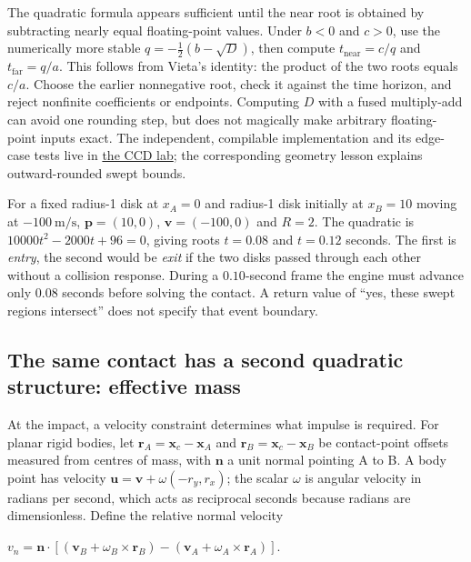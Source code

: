 The quadratic formula appears sufficient until the near root is obtained by subtracting nearly equal floating-point values. Under \(b<0\) and \(c>0\), use the numerically more stable \(q=-\tfrac12(b-\sqrt D)\), then compute \(t_{\mathrm{near}}=c/q\) and \(t_{\mathrm{far}}=q/a\). This follows from Vieta's identity: the product of the two roots equals \(c/a\). Choose the earlier nonnegative root, check it against the time horizon, and reject nonfinite coefficients or endpoints. Computing \(D\) with a fused multiply-add can avoid one rounding step, but does not magically make arbitrary floating-point inputs exact. The independent, compilable implementation and its edge-case tests live in \hyperref[source-file-887bbb1db2a031cbbf1eee43]{the CCD lab}; the corresponding geometry lesson explains outward-rounded swept bounds.

For a fixed radius-1 disk at \(x_A=0\) and radius-1 disk initially at \(x_B=10\) moving at \(-100\ \mathrm{m/s}\), \(\mathbf p=(10,0)\), \(\mathbf v=(-100,0)\) and \(R=2\). The quadratic is \(10000t^2-2000t+96=0\), giving roots \(t=0.08\) and \(t=0.12\) seconds. The first is \emph{entry}, the second would be \emph{exit} if the two disks passed through each other without a collision response. During a \(0.10\)-second frame the engine must advance only \(0.08\) seconds before solving the contact. A return value of ``yes, these swept regions intersect'' does not specify that event boundary.

\subsection{The same contact has a second quadratic structure: effective mass}\label{01-foundations-i-ch018-the-same-contact-has-a-second-quadratic-structure-effective-mass}

At the impact, a velocity constraint determines what impulse is required. For planar rigid bodies, let \(\mathbf r_A=\mathbf x_c-\mathbf x_A\) and \(\mathbf r_B=\mathbf x_c-\mathbf x_B\) be contact-point offsets measured from centres of mass, with \(\mathbf n\) a unit normal pointing A to B. A body point has velocity \(\mathbf u=\mathbf v+\omega(-r_y,r_x)\); the scalar \(\omega\) is angular velocity in radians per second, which acts as reciprocal seconds because radians are dimensionless. Define the relative normal velocity

\(v_n=\mathbf n\cdot\left[
(\mathbf v_B+\omega_B\times\mathbf r_B)-
(\mathbf v_A+\omega_A\times\mathbf r_A)\right].\)

